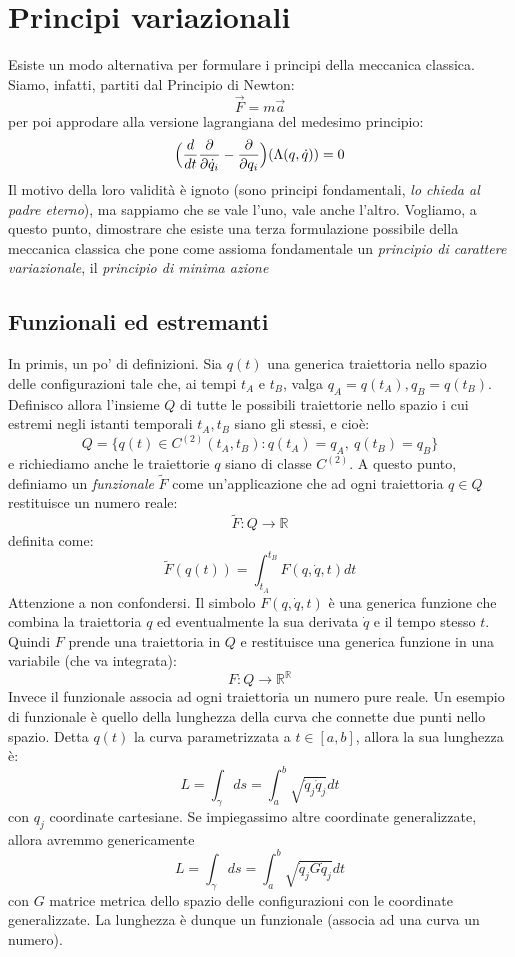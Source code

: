 \documentclass[a4paper,openany]{article}
\begin{document}
	\section{Principi variazionali}
	Esiste un modo alternativa per formulare i principi della meccanica classica. Siamo, infatti, partiti dal Principio di Newton:
	$$\vec{F} = m\vec{a}$$
	per poi approdare alla versione lagrangiana del medesimo principio:
	\begin{equation}\label{key}
		\Bigl(\dfrac{d}{dt}\dfrac{\partial}{\partial \dot{q}_i}-\dfrac{\partial}{\partial q_i}\Bigl)(\Lambda(q,\dot{q})) = 0
	\end{equation}
	Il motivo della loro validità è ignoto (sono principi fondamentali, \textit{lo chieda al padre eterno}), ma sappiamo che se vale l'uno, vale anche l'altro. Vogliamo, a questo punto, dimostrare che esiste una terza formulazione possibile della meccanica classica che pone come assioma fondamentale un \textit{principio di carattere variazionale}, il \textit{principio di minima azione}
	\subsection{Funzionali ed estremanti}
	In primis, un po' di definizioni. Sia $q(t)$ una generica traiettoria nello spazio delle configurazioni tale che, ai tempi $t_A \mbox{ e } t_B$, valga $q_A = q(t_A), q_B = q(t_B)$. Definisco allora l'insieme $Q$ di tutte le possibili traiettorie nello spazio i cui estremi negli istanti temporali $t_A, t_B$ siano gli stessi, e cioè:
	\begin{equation}
		Q = \{q(t)\in C^{(2)}(t_A,t_B): q(t_A) = q_A, \> q(t_B) = q_B\}
	\end{equation}
	e richiediamo anche le traiettorie $q$ siano di classe $C^{(2)}$. A questo punto, definiamo un \textit{funzionale} $\tilde{F}$ come un'applicazione che ad ogni traiettoria $q \in Q$ restituisce un numero reale:
	$$
	\tilde{F} : Q \rightarrow \mathbb{R}
	$$
	definita come:
	$$
	\tilde{F}(q(t)) = \int_{t_A}^{t_B}F(q,\dot{q},t) dt
	$$
	Attenzione a non confondersi. Il simbolo $F(q,\dot{q},t)$ è una generica funzione che combina la traiettoria $q$ ed eventualmente la sua derivata $\dot{q}$ e il tempo stesso $t$. Quindi $F$ prende una traiettoria in $Q$ e restituisce una generica funzione in una variabile (che va integrata):
	$$
	F : Q \rightarrow \mathbb{R}^{\mathbb{R}}
	$$
	Invece il funzionale associa ad ogni traiettoria un numero pure reale. Un esempio di funzionale è quello della lunghezza della curva che connette due punti nello spazio. Detta $q(t)$ la curva parametrizzata a $t\in[a,b]$, allora la sua lunghezza è:
	$$
	L = \int_{\gamma}ds = \int_{a}^{b}\sqrt{\dot{q}_j \dot{q}_j}dt
	$$
	con $q_j$ coordinate cartesiane. Se impiegassimo altre coordinate generalizzate, allora avremmo genericamente
	$$
	L = \int_{\gamma}ds = \int_{a}^{b}\sqrt{\dot{q}_j G\dot{q}_j}dt
	$$
	con $G$ matrice metrica dello spazio delle configurazioni con le coordinate generalizzate. La lunghezza è dunque un funzionale (associa ad una curva un numero). 
	
\end{document}

